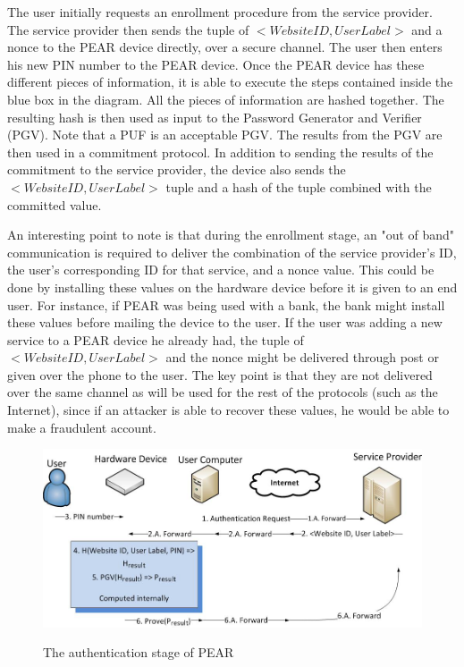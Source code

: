 The user initially requests an enrollment procedure from the service provider. The service provider then sends the tuple
of $<Website ID, User Label>$ and a nonce to the PEAR device directly, over a secure channel. The user then enters his
new PIN number to the PEAR device. Once the PEAR device has these different pieces of information, it is able to execute
the steps contained inside the blue box in the diagram. All the pieces of information are hashed together. The resulting
hash is then used as input to the Password Generator and Verifier (PGV). Note that a PUF is an acceptable PGV. The results
from the PGV are then used in a commitment protocol. In addition to sending the results of the commitment to the service
provider, the device also sends the $<Website ID, User Label>$ tuple and a hash of the tuple combined with the committed value.

An interesting point to note is that during the enrollment stage, an "out of band" communication is required to deliver
the combination of the service provider's ID, the user's corresponding ID for that service, and a nonce value. This could
be done by installing these values on the hardware device before it is given to an end user. For instance, if PEAR was being
used with a bank, the bank might install these values before mailing the device to the user. If the user was adding a new
service to a PEAR device he already had, the tuple of $<Website ID, User Label>$ and the nonce might be delivered through
post or given over the phone to the user. The key point is that they are not delivered over the same channel as will be
used for the rest of the protocols (such as the Internet), since if an attacker is able to recover these values, he would
be able to make a fraudulent account.



\begin{figure}[!ht]
\includegraphics[width=500px]{images/auth.jpg}
\label{fig:pearauthentication}
\caption{The authentication stage of PEAR}
\end{figure}
\FloatBarrier

